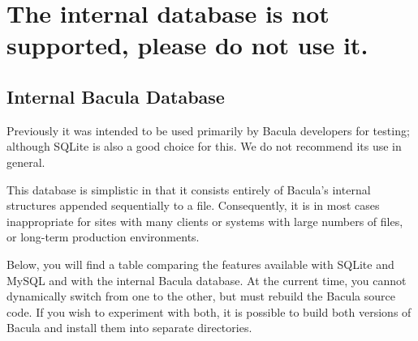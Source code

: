 
\chapter{The internal database is not supported, please do not
use it.}
\label{InternalDbChapter}

\section{Internal Bacula Database}

Previously it was intended to be used primarily by Bacula developers for
testing; although SQLite is also a good choice for this. We do not recommend
its use in general. 

This database is simplistic in that it consists entirely of Bacula's internal
structures appended sequentially to a file. Consequently, it is in most cases
inappropriate for sites with many clients or systems with large numbers of
files, or long-term production environments. 

Below, you will find a table comparing the features available with SQLite and
MySQL and with the internal Bacula database. At the current time, you cannot
dynamically switch from one to the other, but must rebuild the Bacula source
code. If you wish to experiment with both, it is possible to build both
versions of Bacula and install them into separate directories. 

